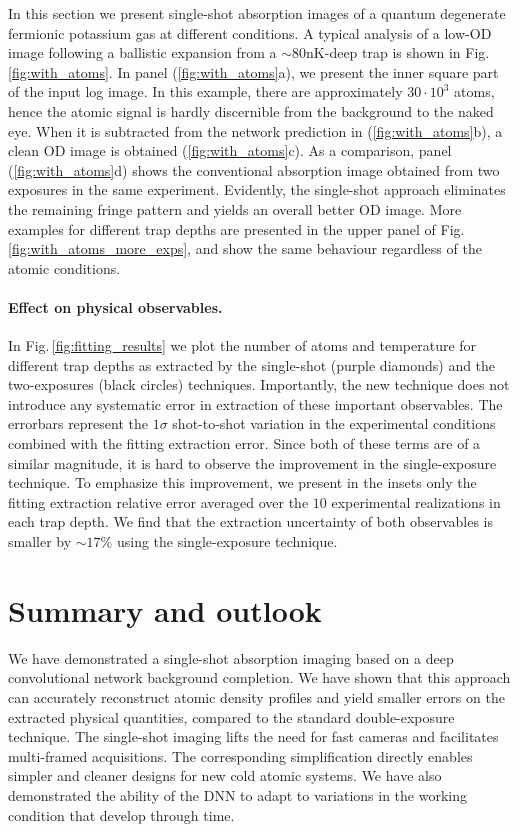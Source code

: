 \documentclass[twocolumn,groupedaddress,longbibliography]{revtex4-1}
\begin{document}
In this section we present single-shot absorption images of a quantum degenerate fermionic potassium gas at different conditions. 
A typical analysis of a low-OD image following a ballistic expansion from a $\sim80\mathrm{nK}$-deep trap is shown in Fig.\,\ref{fig:with_atoms}. In panel (\ref{fig:with_atoms}a), we present the inner square part of the input log image. In this example, there are approximately $30\cdot10^3$ atoms, hence the atomic signal is hardly discernible from the background to the naked eye. When it is subtracted from the network prediction in (\ref{fig:with_atoms}b), a clean OD image is obtained (\ref{fig:with_atoms}c). As a comparison, panel (\ref{fig:with_atoms}d) shows the conventional absorption image obtained from two exposures in the same experiment. Evidently, the single-shot approach eliminates the remaining fringe pattern and yields an overall better OD image. More examples for different trap depths are presented in the upper panel of Fig.\,\ref{fig:with_atoms_more_exps}, and show the same behaviour regardless of the atomic conditions.

\paragraph*{Effect on physical observables.}

In Fig.\,\ref{fig:fitting_results} we plot the number of atoms and temperature for different trap depths as extracted by the single-shot (purple diamonds) and the two-exposures (black circles) techniques. Importantly, the new technique does not introduce any systematic error in extraction of these important observables. The errorbars represent the $1\sigma$ shot-to-shot variation in the experimental conditions combined with the fitting extraction error. Since both of these terms are of a similar magnitude, it is hard to observe the improvement in the single-exposure technique. To emphasize this improvement, we present in the insets only the fitting extraction relative error averaged over the $10$ experimental realizations in each trap depth. We find that the extraction uncertainty of both observables is smaller by $\sim17\%$ using the single-exposure technique.

\section{Summary and outlook}

We have demonstrated a single-shot absorption imaging based on a deep convolutional network background completion. We have shown that this approach can accurately reconstruct atomic density profiles and yield smaller errors on the extracted physical quantities, compared to the standard double-exposure technique. The single-shot imaging lifts the need for fast cameras and facilitates multi-framed acquisitions. The corresponding simplification directly enables simpler and cleaner designs for new cold atomic systems. We have also demonstrated the ability of the DNN to adapt to variations in the working condition that develop through time.
\end{document}
